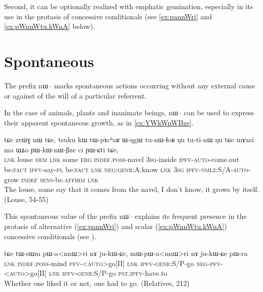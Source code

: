 \documentclass[oldfontcommands,oneside,a4paper,11pt]{article}
\newcommand{\ipa}[1]{{\phon \mbox{#1}}} %
\begin{document}
Second, it can be optionally realized with emphatic gemination, especially in its use in the protasis of concessive conditionals (see \ref{ex:pannWri} and \ref{ex:pWnnWtu.kWnA}  below).


 
\section{Spontaneous}
The prefix \ipa{nɯ--} marks spontaneous actions  occurring without any external cause or against of the will of a particular referrent.

In the case of animals, plants and inanimate beings, \ipa{nɯ--} can be used to express  their apparent spontaneous growth, as in \ref{ex:YWkWnWBze}.
\begin{exe}
\ex \label{ex:YWkWnWBze}
\gll 
\ipa{tɕe} 	\ipa{zrɯɣ} 	\ipa{nɯ} 	\ipa{tɕe,} 	\ipa{tsuku} 	\ipa{kɯ} 	\ipa{tɯ-pɤcʰaʁ} 	\ipa{ɯ-ŋgɯ} 	\ipa{tu-nɯ-ɬoʁ} 	\ipa{ŋu} 	\ipa{tu-ti-nɯ} 	\ipa{ŋu} 	\ipa{tɕe} 	\ipa{mɤxsi} 	\ipa{ma} 	\ipa{ɯʑo} 	\ipa{ɲɯ-kɯ-nɯ-βze} 	\ipa{ci} 	\ipa{ɲɯ-ɕti} 	\ipa{tɕe,} 	\\
\textsc{lnk} louse \textsc{dem} \textsc{lnk} some \textsc{erg} \textsc{indef.poss}-navel \textsc{3sg}-inside \textsc{ipfv-auto}-come.out be:\textsc{fact} \textsc{ipfv}-say-\textsc{pl}  be:\textsc{fact} \textsc{lnk} \textsc{neg:genr:}A:know \textsc{lnk} \textsc{3sg} \textsc{ipfv-nmlz:S/A-auto}-grow \textsc{indef} \textsc{sens}-be.\textsc{affirm} \textsc{lnk} \\
\glt The louse, some say that it comes from the navel, I don't know, it grows by itself. (Louse, 54-55)
\end{exe}

This spontaneous value of the prefix \ipa{nɯ--}  explains its frequent presence in the protasis of alternative  (\ref{ex:pannWri}) and scalar (\ref{ex:pWnnWtu.kWnA})  concessive conditionals (see \citealt{jacques14linking}).

\begin{exe}
\ex  \label{ex:pannWri}
\gll
\ipa{tɕe}  	\ipa{tɯ-sɯm}  	\ipa{pɯ-a<nnɯ>ri}  	\ipa{nɤ}  	\ipa{ju-kɯ-ɕe,}  \ipa{mɯ-pɯ-a<nnɯ>ri}  	\ipa{nɤ}  	\ipa{ju-kɯ-ɕe}  	\ipa{pɯ-ra}  \\
\textsc{lnk} \textsc{indef.poss}-mind  \textsc{pfv-<auto>}go[II] \textsc{lnk} \textsc{ipfv-genr}:S/P-go \textsc{neg-pfv-<auto>}go[II] \textsc{lnk} \textsc{ipfv-genr}:S/P-go \textsc{pst.ipfv}-have.to \\
\glt Whether one liked it or not, one had to go. (Relatives, 212)
\end{exe}
\end{document}
